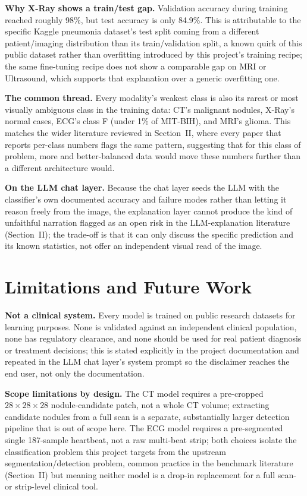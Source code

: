 \documentclass[conference]{IEEEtran}
\begin{document}
\textbf{Why X-Ray shows a train/test gap.} Validation accuracy during training reached roughly 98\%, but test accuracy is only 84.9\%. This is attributable to the specific Kaggle pneumonia dataset's test split coming from a different patient/imaging distribution than its train/validation split, a known quirk of this public dataset rather than overfitting introduced by this project's training recipe; the same fine-tuning recipe does not show a comparable gap on MRI or Ultrasound, which supports that explanation over a generic overfitting one.

\textbf{The common thread.} Every modality's weakest class is also its rarest or most visually ambiguous class in the training data: CT's malignant nodules, X-Ray's normal cases, ECG's class F (under 1\% of MIT-BIH), and MRI's glioma. This matches the wider literature reviewed in Section~II, where every paper that reports per-class numbers flags the same pattern, suggesting that for this class of problem, more and better-balanced data would move these numbers further than a different architecture would.

\textbf{On the LLM chat layer.} Because the chat layer seeds the LLM with the classifier's own documented accuracy and failure modes rather than letting it reason freely from the image, the explanation layer cannot produce the kind of unfaithful narration flagged as an open risk in the LLM-explanation literature (Section~II); the trade-off is that it can only discuss the specific prediction and its known statistics, not offer an independent visual read of the image.

\section{Limitations and Future Work}

\textbf{Not a clinical system.} Every model is trained on public research datasets for learning purposes. None is validated against an independent clinical population, none has regulatory clearance, and none should be used for real patient diagnosis or treatment decisions; this is stated explicitly in the project documentation and repeated in the LLM chat layer's system prompt so the disclaimer reaches the end user, not only the documentation.

\textbf{Scope limitations by design.} The CT model requires a pre-cropped $28\times28\times28$ nodule-candidate patch, not a whole CT volume; extracting candidate nodules from a full scan is a separate, substantially larger detection pipeline that is out of scope here. The ECG model requires a pre-segmented single 187-sample heartbeat, not a raw multi-beat strip; both choices isolate the classification problem this project targets from the upstream segmentation/detection problem, common practice in the benchmark literature (Section~II) but meaning neither model is a drop-in replacement for a full scan- or strip-level clinical tool.
\end{document}
